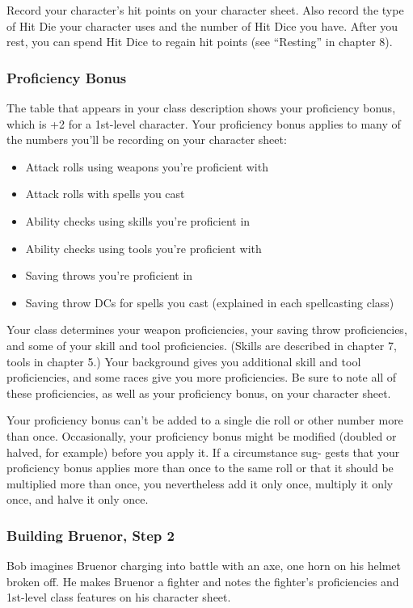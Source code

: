 Record your character’s hit points on your character sheet. Also record the type of Hit Die your character uses and the number of Hit Dice you have. After you rest, you can spend Hit Dice to regain hit points (see “Resting” in chapter 8).

\subsubsection{Proficiency Bonus}
The table that appears in your class description shows your proficiency bonus, which is +2 for a 1st-level character. Your proficiency bonus applies to many of the numbers you’ll be recording on your character sheet:

\begin{itemize}
  \item Attack rolls using weapons you’re proficient with
  \item Attack rolls with spells you cast
  \item Ability checks using skills you’re proficient in
  \item Ability checks using tools you’re proficient with
  \item Saving throws you’re proficient in
  \item Saving throw DCs for spells you cast (explained in each spellcasting class)
\end{itemize}

Your class determines your weapon proficiencies, your saving throw proficiencies, and some of your skill and tool proficiencies. (Skills are described in chapter 7, tools in chapter 5.) Your background gives you additional skill and tool proficiencies, and some races give you more proficiencies. Be sure to note all of these proficiencies, as well as your proficiency bonus, on your character sheet.

Your proficiency bonus can’t be added to a single die roll or other number more than once. Occasionally, your proficiency bonus might be modified (doubled or halved, for example) before you apply it. If a circumstance sug- gests that your proficiency bonus applies more than once to the same roll or that it should be multiplied more than once, you nevertheless add it only once, multiply it only once, and halve it only once.

\subsubsection{Building Bruenor, Step 2}
Bob imagines Bruenor charging into battle with an axe, one horn on his helmet broken off. He makes Bruenor a fighter and notes the fighter’s proficiencies and 1st-level class features on his character sheet.

